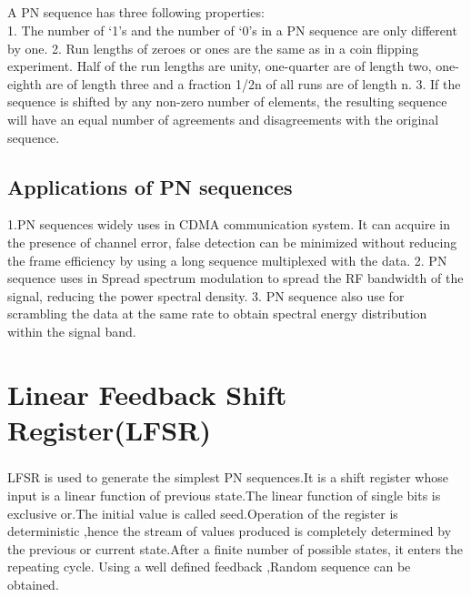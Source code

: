 \documentclass[a4paper]{report}
\begin{document}
\paragraph{}
\large\textnormal{A PN sequence has three following properties:}\\
\textnormal{1. The number of ‘1’s and the number of ‘0’s in a PN sequence are only different by one.}\newline\newline
\textnormal{2. Run lengths of zeroes or ones are the same as in a coin flipping experiment. Half of the run lengths are unity, one-quarter are of length two, one-eighth are of  length three and a fraction 1/2n  of all runs are of length n.}\newline\newline
\textnormal{3. If the sequence is shifted by any non-zero number of elements, the resulting sequence will have an equal number of agreements and disagreements with the original sequence.}\\
\section{Applications of PN sequences}
\textnormal{1.PN sequences widely uses in CDMA communication system. It can acquire in the presence of channel error, false detection can be minimized without reducing the frame efficiency by using a long sequence multiplexed with the data.}\newline\newline
\textnormal{2. PN sequence uses in Spread spectrum modulation to spread the RF bandwidth of the signal, reducing the power spectral density.}\newline\newline
\textnormal{3.  PN sequence also use for scrambling the data at the same rate to obtain spectral energy distribution within the signal band.}\\
\chapter{Linear Feedback Shift Register(LFSR)}
\paragraph{}
\large\textnormal{LFSR is used to generate the simplest PN sequences.It is a shift register whose input is a linear function of previous state.The linear function of single bits is exclusive or.The initial value is called seed.Operation of the register is deterministic ,hence the stream of values produced is completely determined by the previous or current state.After a finite number of possible states, it enters the repeating cycle.
Using a well defined feedback ,Random sequence can be obtained.}
\end{document}
